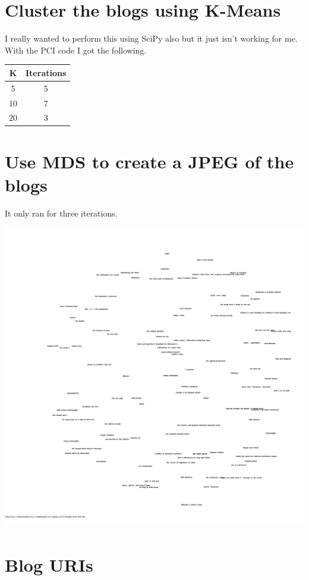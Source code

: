 \documentclass[12pt, a4paper]{article}
\begin{document}
\section{Cluster the blogs using K-Means}

I really wanted to perform this using SciPy also but it just isn't working for me. With the PCI code I got the following.

\begin{table}[h]
\centering
\begin{tabular}{|c|c|}
\hline
\textbf{K} & \textbf{Iterations} \\ \hline
5          & 5                   \\ \hline
10         & 7                   \\ \hline
20         & 3                   \\ \hline
\end{tabular}
\end{table}

\section{Use MDS to create a JPEG of the blogs}

It only ran for three iterations.

\includegraphics[width=\textwidth]{../art/blogs2d.jpg}

\section{Blog URIs}


\end{document}
